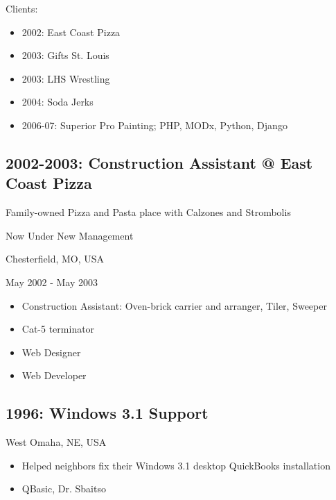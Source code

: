 \documentclass[letter,,openany,oneside]{sphinxhowto}
\begin{document}
Clients:
\begin{itemize}
\item {} 
2002: East Coast Pizza

\item {} 
2003: Gifts St. Louis

\item {} 
2003: LHS Wrestling

\item {} 
2004: Soda Jerks

\item {} 
2006-07: Superior Pro Painting; PHP, MODx, Python, Django

\end{itemize}


\subsection{2002-2003: Construction Assistant @ East Coast Pizza}
\label{resume:construction-assistant-east-coast-pizza}
\begin{DUlineblock}{0em}
\item[] Family-owned Pizza and Pasta place with Calzones and Strombolis
\item[] Now Under New Management
\item[] Chesterfield, MO, USA
\item[] May 2002 - May 2003
\end{DUlineblock}
\begin{itemize}
\item {} 
Construction Assistant: Oven-brick carrier and arranger, Tiler, Sweeper

\item {} 
Cat-5 terminator

\item {} 
Web Designer

\item {} 
Web Developer

\end{itemize}


\subsection{1996: Windows 3.1 Support}
\label{resume:windows-3-1-support}
\begin{DUlineblock}{0em}
\item[] West Omaha, NE, USA
\end{DUlineblock}
\begin{itemize}
\item {} 
Helped neighbors fix their Windows 3.1 desktop QuickBooks installation

\item {} 
QBasic, Dr. Sbaitso

\end{itemize}
\end{document}
